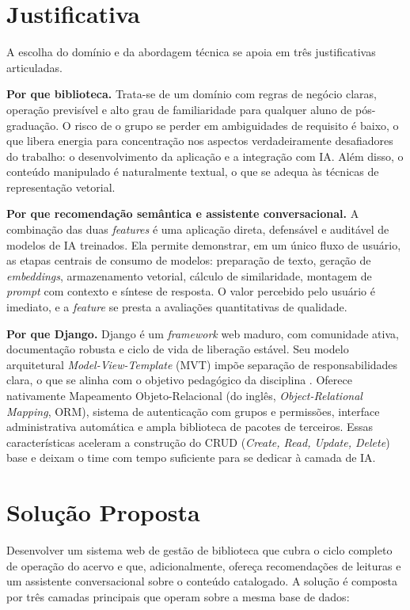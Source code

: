 \documentclass[monografia,abnt]{inf-ufg-modificado}
\begin{document}
\section{Justificativa}

A escolha do domínio e da abordagem técnica se apoia em três justificativas articuladas.

\noindent\textbf{Por que biblioteca.} Trata-se de um domínio com regras de negócio claras, operação previsível e alto grau de familiaridade para qualquer aluno de pós-graduação. O risco de o grupo se perder em ambiguidades de requisito é baixo, o que libera energia para concentração nos aspectos verdadeiramente desafiadores do trabalho: o desenvolvimento da aplicação e a integração com IA. Além disso, o conteúdo manipulado é naturalmente textual, o que se adequa às técnicas de representação vetorial.

\noindent\textbf{Por que recomendação semântica e assistente conversacional.} A combinação das duas \textit{features} é uma aplicação direta, defensável e auditável de modelos de IA treinados. Ela permite demonstrar, em um único fluxo de usuário, as etapas centrais de consumo de modelos: preparação de texto, geração de \textit{embeddings}, armazenamento vetorial, cálculo de similaridade, montagem de \textit{prompt} com contexto e síntese de resposta. O valor percebido pelo usuário é imediato, e a \textit{feature} se presta a avaliações quantitativas de qualidade.

\noindent\textbf{Por que Django.} Django é um \textit{framework} web maduro, com comunidade ativa, documentação robusta e ciclo de vida de liberação estável. Seu modelo arquitetural \textit{Model-View-Template} (MVT) impõe separação de responsabilidades clara, o que se alinha com o objetivo pedagógico da disciplina \cite{dani}. Oferece nativamente Mapeamento Objeto-Relacional (do inglês, \textit{Object-Relational Mapping}, ORM), sistema de autenticação com grupos e permissões, interface administrativa automática e ampla biblioteca de pacotes de terceiros. Essas características aceleram a construção do CRUD (\textit{Create, Read, Update, Delete}) base e deixam o time com tempo suficiente para se dedicar à camada de IA.

\section{Solução Proposta}

Desenvolver um sistema web de gestão de biblioteca que cubra o ciclo completo de operação do acervo e que, adicionalmente, ofereça recomendações de leituras e um assistente conversacional sobre o conteúdo catalogado. A solução é composta por três camadas principais que operam sobre a mesma base de dados:
\end{document}
